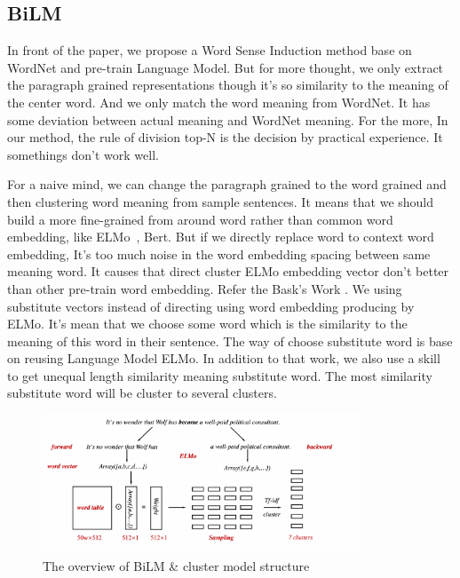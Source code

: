\subsection{BiLM}
\label{sec:bilm}

In front of the paper, we propose a Word Sense Induction method base on WordNet and pre-train Language Model.
But for more thought, we only extract the paragraph grained representations though it's so similarity to the meaning of the center word.
And we only match the word meaning from WordNet. It has some deviation between actual meaning and WordNet meaning.
For the more, In our method, the rule of division top-N is the decision by practical experience. It somethings don't work well.

For a naive mind, we can change the paragraph grained to the word grained and then clustering word meaning from sample sentences.
It means that we should build a more fine-grained from around word rather than common word embedding, like ELMo~\cite{Peters:2018}, Bert.
But if we directly replace word to context word embedding, It's too much noise in the word embedding spacing between same meaning word.
It causes that direct cluster ELMo embedding vector don't better than other pre-train word embedding.
Refer the Bask's Work \cite{baskaya2013ai}. We using substitute vectors instead of directing using word embedding producing by ELMo.
It's mean that we choose some word which is the similarity to the meaning of this word in their sentence.
The way of choose substitute word \cite{baskaya2013ai} is base on reusing Language Model ELMo.
In addition to that work, we also use a skill to get unequal length similarity meaning substitute word.
The most similarity substitute word will be cluster to several clusters. 

\begin{figure}[ht]
    \begin{center}
    \includegraphics[width=0.85\textwidth]{figures/BiLM.pdf}
    \end{center}
    \caption{The overview of BiLM \& cluster model structure}
    \label{fig:overall_model}
\end{figure}

